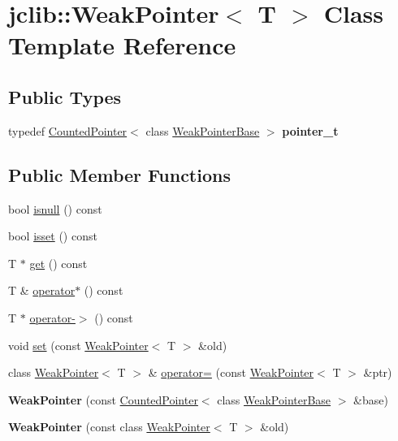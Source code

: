 \hypertarget{classjclib_1_1WeakPointer}{}\section{jclib\+:\+:Weak\+Pointer$<$ T $>$ Class Template Reference}
\label{classjclib_1_1WeakPointer}
\subsection*{Public Types}
\begin{DoxyCompactItemize}
\item 
\mbox{\label{classjclib_1_1WeakPointer_a4405f4f8961dac628e8ab1a9f8a210b9}} 
typedef \hyperlink{classjclib_1_1CountedPointer}{Counted\+Pointer}$<$ class \hyperlink{classjclib_1_1WeakPointerBase}{Weak\+Pointer\+Base} $>$ {\bfseries pointer\+\_\+t}
\end{DoxyCompactItemize}
\subsection*{Public Member Functions}
\begin{DoxyCompactItemize}
\item 
bool \hyperlink{classjclib_1_1WeakPointer_a5cbfbf27685b4591674fa19e1db8dafa}{isnull} () const
\item 
bool \hyperlink{classjclib_1_1WeakPointer_a14f8326fd06df4bbe22e396b18b1a269}{isset} () const
\item 
T $\ast$ \hyperlink{classjclib_1_1WeakPointer_adade4f82b6443201e18991fd0d9d4189}{get} () const
\item 
T \& \hyperlink{classjclib_1_1WeakPointer_ac315d93be7091e0700f7f692b37edb0c}{operator$\ast$} () const
\item 
T $\ast$ \hyperlink{classjclib_1_1WeakPointer_a4b86a3794ba135e7400fbcd64915b68a}{operator-\/$>$} () const
\item 
void \hyperlink{classjclib_1_1WeakPointer_a7de963c695578295c0c1b545b664d405}{set} (const \hyperlink{classjclib_1_1WeakPointer}{Weak\+Pointer}$<$ T $>$ \&old)
\item 
class \hyperlink{classjclib_1_1WeakPointer}{Weak\+Pointer}$<$ T $>$ \& \hyperlink{classjclib_1_1WeakPointer_a9def3bcb6fee153227e00389cdc8d5b7}{operator=} (const \hyperlink{classjclib_1_1WeakPointer}{Weak\+Pointer}$<$ T $>$ \&ptr)
\item 
\mbox{\label{classjclib_1_1WeakPointer_a0b8f74c55c8fa75976c7acd81ef2f25e}} 
{\bfseries Weak\+Pointer} (const \hyperlink{classjclib_1_1CountedPointer}{Counted\+Pointer}$<$ class \hyperlink{classjclib_1_1WeakPointerBase}{Weak\+Pointer\+Base} $>$ \&base)
\item 
\mbox{\label{classjclib_1_1WeakPointer_ae811c41f36032945f78ed2a71322c4a4}} 
{\bfseries Weak\+Pointer} (const class \hyperlink{classjclib_1_1WeakPointer}{Weak\+Pointer}$<$ T $>$ \&old)
\end{DoxyCompactItemize}


